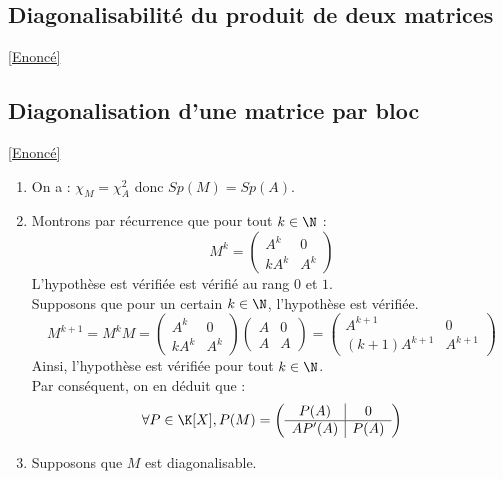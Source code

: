 \documentclass[8pt]{book}
\begin{document}
	\subsection{Diagonalisabilité du produit de deux matrices}
	\label{Diagonalisabilité du produit de deux matrices corrigé}
	\textcolor{blue}{\hyperref[Diagonalisabilité du produit de deux matrices]{[Enoncé]}}\\
	
	\subsection{Diagonalisation d'une matrice par bloc}
	\label{Diagonalisation d'une matrice par bloc corrigé}
	\textcolor{blue}{\hyperref[Diagonalisation d'une matrice par bloc]{[Enoncé]}}\\
	\begin{enumerate}
		\item On a : $\chi_M=\chi_A^2$ donc $Sp(M)=Sp(A)$.
		\item Montrons par récurrence que pour tout $k\in\N$ :
		\[M^k=\left(\begin{array}{c|c}
			A^k&0  \\
			\hline
			kA^k&A^k
		\end{array}\right)\]
		L'hypothèse est vérifiée est vérifié au rang $0$ et $1$.\\
		Supposons que pour un certain $k\in\N$, l'hypothèse est vérifiée.\\
		\[M^{k+1}=M^kM=\left(\begin{array}{c|c}
			A^k&0  \\
			\hline
			kA^k&A^k
		\end{array}\right)\left(\begin{array}{c|c}
		A&0  \\
		\hline
		A&A
		\end{array}\right)=\left(\begin{array}{c|c}
		A^{k+1}&0  \\
		\hline
		(k+1)A^{k+1}&A^{k+1}
		\end{array}\right)\]
		Ainsi, l'hypothèse est vérifiée pour tout $k\in\N$.\\
		Par conséquent, on en déduit que :
		\[\forall P\in\K[X], P(M)=\left(\begin{array}{c|c}
			P(A)&0  \\
			\hline
			AP'(A)&P(A)
		\end{array}\right)\]
		\item Supposons que $M$ est diagonalisable.\\

\end{enumerate}
\end{document}
